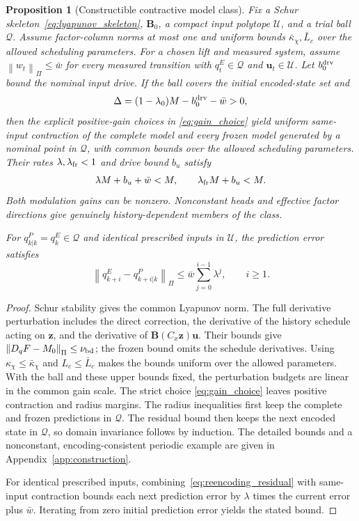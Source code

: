 \documentclass[journal]{IEEEtran}
\theoremstyle{plain}
\newtheorem{proposition}{Proposition}
\theoremstyle{definition}
\newcommand{\vu}{\mathbf{u}}
\newcommand{\vz}{\mathbf{z}}
\newcommand{\mB}{\mathbf{B}}
\newcommand{\norm}[1]{\left\lVert #1\right\rVert}
\begin{document}
\begin{proposition}[Constructible contractive model class]
\label{prop:contractive_class}
Fix a Schur skeleton~\eqref{eq:lyapunov_skeleton}, $\mB_0$, a compact input polytope $\mathcal U$, and a trial ball $\mathcal Q$. Assume factor-column norms at most one and uniform bounds $\bar\kappa_\chi,\bar L_c$ over the allowed scheduling parameters. For a chosen lift and measured system, assume $\norm{w_t}_\Pi\le\bar w$ for every measured transition with $q_t^E\in\mathcal Q$ and $\vu_t\in\mathcal U$. Let $b_0^{\rm drv}$ bound the nominal input drive. If the ball covers the initial encoded-state set and
\begin{equation}
\Delta=(1-\lambda_0)M-b_0^{\rm drv}-\bar w>0,
\label{eq:radius_margin}
\end{equation}
then the explicit positive-gain choices in \eqref{eq:gain_choice} yield uniform same-input contraction of the complete model and every frozen model generated by a nominal point in $\mathcal Q$, with common bounds over the allowed scheduling parameters. Their rates $\lambda,\lambda_{\rm fr}<1$ and drive bound $b_u$ satisfy
\begin{equation}
\lambda M+b_u+\bar w<M,\qquad \lambda_{\rm fr}M+b_u<M.
\label{eq:invariant_radius}
\end{equation}
Both modulation gains can be nonzero. Nonconstant heads and effective factor directions give genuinely history-dependent members of the class.

For $q_{k|k}^P=q_k^E\in\mathcal Q$ and identical prescribed inputs in $\mathcal U$, the prediction error satisfies
\begin{equation*}
\norm{q_{k+i}^E-q_{k+i|k}^P}_\Pi\le\bar w\sum_{j=0}^{i-1}\lambda^j,\qquad i\ge1.
\end{equation*}
\end{proposition}
\begin{proof}
Schur stability gives the common Lyapunov norm. The full derivative perturbation includes the direct correction, the derivative of the history schedule acting on $\vz$, and the derivative of $\mB(C_x\vz)\vu$. Their bounds give $\norm{D_qF-M_0}_\Pi\le\nu_{\rm bd}$; the frozen bound omits the schedule derivatives. Using $\kappa_\chi\le\bar\kappa_\chi$ and $L_c\le\bar L_c$ makes the bounds uniform over the allowed parameters. With the ball and these upper bounds fixed, the perturbation budgets are linear in the common gain scale. The strict choice \eqref{eq:gain_choice} leaves positive contraction and radius margins. The radius inequalities first keep the complete and frozen predictions in $\mathcal Q$. The residual bound then keeps the next encoded state in $\mathcal Q$, so domain invariance follows by induction. The detailed bounds and a nonconstant, encoding-consistent periodic example are given in Appendix~\ref{app:construction}.

For identical prescribed inputs, combining~\eqref{eq:reencoding_residual} with same-input contraction bounds each next prediction error by $\lambda$ times the current error plus $\bar w$. Iterating from zero initial prediction error yields the stated bound.
\end{proof}
\end{document}
